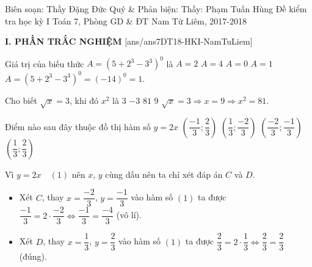 
	\begin{name}
		{Biên soạn: Thầy Đặng Đức Quý \& Phản biện: Thầy: Phạm Tuấn Hùng}
		{Đề kiểm tra học kỳ I Toán 7, Phòng GD \& ĐT Nam Từ Liêm, 2017-2018}
	\end{name}
	\noindent\textbf{I. PHẦN TRẮC NGHIỆM}
	\setcounter{ex}{0}
	[ans/ans7DT18-HKI-NamTuLiem]
		\begin{ex}%
		Giá trị của biếu thức $A = (5+2^3 - 3^3)^0$ là
		\choice
		{$A = 2$}
		{$A = 4$}
		{$A = 0$}
		{\True $A = 1$ }
		\loigiai
		{
			$A = (5 + 2^3 - 3^3)^0 = (-14)^0 = 1.$
		}
	\end{ex}
	\begin{ex}%
	Cho biết $\sqrt{x} = 3$, khi đó $x^2$ là
	\choice
	{$3$}
	{$-3$}
	{\True $81$}
	{$9$}
	\loigiai
	{
	$\sqrt{x} = 3 \Rightarrow x = 9 \Rightarrow x^2 = 81.$
	}
\end{ex}
	\begin{ex}%
Điểm nào sau đây thuộc đồ thị hàm số $ y = 2x$
	\choice
	{$\left( \dfrac{-1}{3}; \dfrac{2}{3}\right) $}
	{$\left( \dfrac{1}{3}; \dfrac{-2}{3}\right) $}
	{$\left( \dfrac{-2}{3}; \dfrac{-1}{3}\right) $}
	{\True $\left( \dfrac{1}{3}; \dfrac{2}{3}\right) $}
	\loigiai
	{
		Vì $ y = 2x \quad (1)$ nên $x$, $y$ cùng dấu nên ta chỉ xét đáp án $C$ và $D$.
		\begin{itemize}
			\item Xét $C$, thay $x = \dfrac{-2}{3}$, $ y =\dfrac{-1}{3}$ vào hàm số $(1)$ ta được $\dfrac{-1}{3} = 2\cdot \dfrac{-2}{3} \Leftrightarrow \dfrac{-1}{3} = \dfrac{-4}{3}$ (vô lí).
	\item Xét $D$, thay $x = \dfrac{1}{3}$, $ y =\dfrac{2}{3}$ vào hàm số $(1)$ ta được $\dfrac{2}{3} = 2\cdot \dfrac{1}{3} \Leftrightarrow \dfrac{2}{3} = \dfrac{2}{3}$ (đúng).
	\end{itemize}
	}
	\end{ex}

